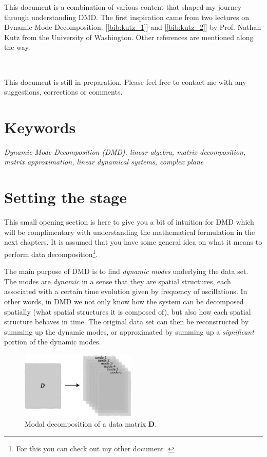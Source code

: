 \documentclass[10pt,twocolumn]{article}
\begin{document}
This document is a combination of various content that shaped my journey through understanding DMD. The first inspiration came from two lectures on Dynamic Mode Decomposition: [\ref{bib:kutz_1}] and [\ref{bib:kutz_2}] by Prof. Nathan Kutz from the University of Washington. Other references are mentioned along the way.

\,\,

This document is still in preparation. Please feel free to contact me with any suggestions, corrections or comments.

\section*{Keywords}

\textit{Dynamic Mode Decomposition (DMD), linear algebra, matrix decomposition, matrix approximation, linear dynamical systems, complex plane}



\tableofcontents


\section{Setting the stage}

This small opening section is here to give you a bit of intuition for DMD which will be complimentary with understanding the mathematical formulation in the next chapters. It is assumed that you have some general idea on what it means to perform data decomposition\footnote{For this you can check out my other document \cite{Zdybal_data_dec}.}.

The main purpose of DMD is to find \textit{dynamic modes} underlying the data set. The modes are \textit{dynamic} in a sense that they are spatial structures, each associated with a certain time evolution given by frequency of oscillations. In other words, in DMD we not only know how the system can be decomposed spatially (what spatial structures it is composed of), but also how each spatial structure behaves in time. The original data set can then be reconstructed by summing up the dynamic modes, or approximated by summing up a \textit{significant} portion of the dynamic modes. 

\begin{figure}[H]
\centering\includegraphics[width=5.5cm]{DMD-modal-decomposition.png}
\caption{Modal decomposition of a data matrix $\mathbf{D}$.}
\label{fig:modal-decomposition}
\end{figure}
\end{document}
